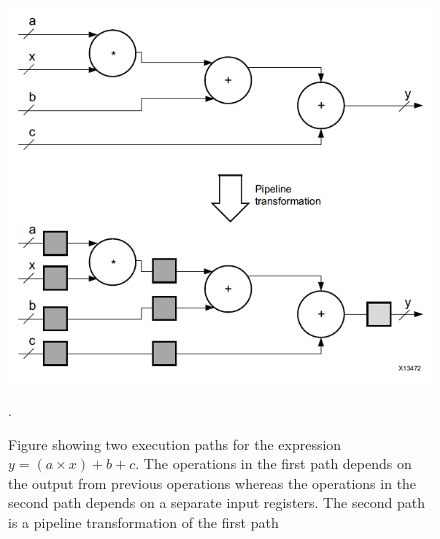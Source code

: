 \documentclass[12pt]{report}
\begin{document}
\begin{figure}
    \centering
    \includegraphics[scale=0.7]{figures/structure_fpga_imp_compute_function.png}
    \caption{Figure showing two execution paths for the expression $y=(a \times x) +  b + c$. The operations in the first path depends on the output from previous operations whereas the operations in the second path depends on a separate input registers. The second path is a pipeline transformation of the first path \citep{XilFPGAIntro}}.
    \label{fig:pipeline}
\end{figure}

\end{document}
